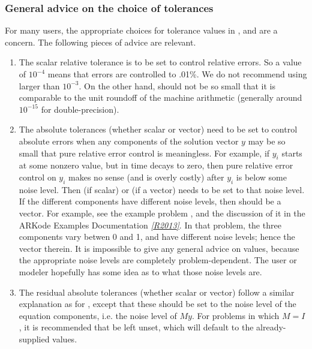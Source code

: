 \documentclass[letterpaper,10pt,english]{sphinxmanual}
\begin{document}
\subsubsection{General advice on the choice of tolerances}
\label{c_interface/User_callable:general-advice-on-the-choice-of-tolerances}
For many users, the appropriate choices for tolerance values in
,  and  are a concern. The following pieces
of advice are relevant.
\begin{enumerate}
\item {} 
The scalar relative tolerance  is to be set to control
relative errors. So a value of \(10^{-4}\) means that errors
are controlled to .01\%. We do not recommend using  larger
than \(10^{-3}\). On the other hand,  should not be so
small that it is comparable to the unit roundoff of the machine
arithmetic (generally around \(10^{-15}\) for double-precision).

\item {} 
The absolute tolerances  (whether scalar or vector) need
to be set to control absolute errors when any components of the
solution vector \(y\) may be so small that pure relative error
control is meaningless.  For example, if \(y_i\) starts at some
nonzero value, but in time decays to zero, then pure relative
error control on \(y_i\) makes no sense (and is overly costly)
after \(y_i\) is below some noise level. Then  (if
scalar) or  (if a vector) needs to be set to that
noise level. If the different components have different noise
levels, then  should be a vector.  For example, see the
example problem , and the discussion
of it in the ARKode Examples Documentation \label{c_interface/User_callable:id1}{\hyperref[References:r2013]{\emph{{[}R2013{]}}}}.  In that
problem, the three components vary betwen 0 and 1, and have
different noise levels; hence the  vector therein. It is
impossible to give any general advice on  values,
because the appropriate noise levels are completely
problem-dependent. The user or modeler hopefully has some idea as
to what those noise levels are.

\item {} 
The residual absolute tolerances  (whether scalar or
vector) follow a similar explanation as for , except
that these should be set to the noise level of the equation
components, i.e. the noise level of \(My\).  For problems in
which \(M=I\), it is recommended that  be left
unset, which will default to the already-supplied 
values.


\end{enumerate}
\end{document}
